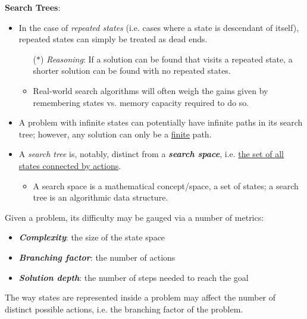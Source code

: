 \documentclass[12pt]{extarticle}
\theoremstyle{definition}
\theoremstyle{remark}
\newcommand{\pstart}[0]{\noindent}
\newcommand{\term}[1]{\noindent\textbf{\textit{#1}}}
\begin{document}
\vspace{16pt}
\noindent\begin{minipage}[t]{0.18\textwidth}
\centering
\textbf{Search Trees}:
\end{minipage}
\noindent\begin{minipage}[t]{0.779\textwidth}
    \begin{itemize}
        \item In the case of \textit{repeated states} (i.e. cases where a state is descendant of itself), repeated states can simply be treated as dead ends. \begin{itemize}
                \item[($\ast$)] \textit{Reasoning}: If a solution can be found that visits a repeated state, a shorter solution can be found with no repeated states.
                \item Real-world search algorithms will often weigh the gains given by remembering states vs. memory capacity required to do so.
            \end{itemize}
        \item A problem with infinite states can potentially have infinite paths in its search tree; however, any solution can only be a \ul{finite} path.
        \item A \textit{search tree} is, notably, distinct from a \term{search space}, i.e. \ul{the set of all states connected by actions}. \begin{itemize}
            \item A search space is a mathematical concept/space, a set of states; a search tree is an algorithmic data structure.
        \end{itemize}
    \end{itemize}
\end{minipage}

\vspace{24pt}\pstart
Given a problem, its difficulty may be gauged via a number of metrics: \begin{itemize}
    \item \term{Complexity}: the size of the state space
    \item \term{Branching factor}: the number of actions
    \item \term{Solution depth}: the number of steps needed to reach the goal
\end{itemize}

\vspace{8pt}\pstart
The way states are represented inside a problem may affect the number of distinct possible actions, i.e. the branching factor of the problem.
\end{document}
